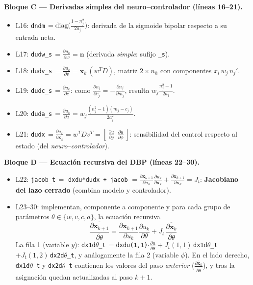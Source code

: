 \documentclass[11pt,a4paper]{article}
\newcommand{\pd}[2]{\frac{\partial #1}{\partial #2}}
\newcommand{\td}[2]{\frac{\overline{\partial #1}}{\overline{\partial #2}}}
\begin{document}
\textbf{Bloque C — Derivadas simples del neuro--controlador (líneas 16--21).}
\begin{itemize}[itemsep=1pt]
\item L16: \texttt{dndm}$\,=\mathrm{diag}\bigl(\frac{1-n_j^2}{2a_j}\bigr)$: derivada de la sigmoide bipolar respecto a su entrada neta.
\item L17: \texttt{dudw\_s}$\,=\pd{u_k}{w}=\mathbf n$ (derivada \emph{simple}: sufijo \texttt{\_s}).
\item L18: \texttt{dudv\_s}$\,=\pd{u_k}{v}=\mathbf x_k\,(w^{T}D)$, matriz $2\times n_h$ con componentes $x_i\,w_j\,n_j'$.
\item L19: \texttt{dudc\_s}$\,=\pd{u_k}{c}$: como $\pd{n_j}{c_j}=-\pd{n_j}{m_j}$, resulta $w_j\frac{n_j^2-1}{2a_j}$.
\item L20: \texttt{duda\_s}$\,=\pd{u_k}{a}=w_j\frac{(n_j^2-1)(m_j-c_j)}{2a_j^2}$.
\item L21: \texttt{dudx}$\,=\pd{u_k}{\mathbf x_k}=w^{T}Dv^{T}=[\,\pd{u}{y}\ \ \pd{u}{\phi}\,]$: sensibilidad del control respecto al estado (del \emph{neuro--controlador}).
\end{itemize}

\textbf{Bloque D — Ecuación recursiva del DBP (líneas 22--30).}
\begin{itemize}[itemsep=1pt]
\item L22: \texttt{jacob\_t}$\,=$ \texttt{dxdu*dudx + jacob} $=\pd{\mathbf x_{k+1}}{u_k}\pd{u_k}{\mathbf x_k}+\pd{\mathbf x_{k+1}}{\mathbf x_k}=J_t$: \textbf{Jacobiano del lazo cerrado} (combina modelo y controlador).
\item L23--30: implementan, componente a componente y para cada grupo de parámetros $\theta\in\{w,v,c,a\}$, la ecuación recursiva
\[
\td{\mathbf x_{k+1}}{\theta}=\pd{\mathbf x_{k+1}}{u_k}\pd{u_k}{\theta}+J_t\,\td{\mathbf x_k}{\theta}
\]
La fila 1 (variable $y$): \texttt{dx1d}$\theta$\texttt{\_t}$\,=$\texttt{dxdu(1,1)}$\cdot\pd{u}{\theta}+J_t(1,1)\,$\texttt{dx1d}$\theta$\texttt{\_t}$+J_t(1,2)\,$\texttt{dx2d}$\theta$\texttt{\_t}, y análogamente la fila 2 (variable $\phi$). En el lado derecho, \texttt{dx1d}$\theta$\texttt{\_t} y \texttt{dx2d}$\theta$\texttt{\_t} contienen los valores del paso \emph{anterior} ($\td{\mathbf x_k}{\theta}$), y tras la asignación quedan actualizadas al paso $k+1$.
\end{itemize}
\end{document}
